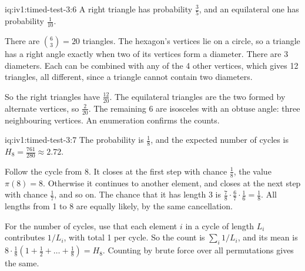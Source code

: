 \begin{solution}{iq:iv1:timed-test-3:6}
A right triangle has probability $\frac35$, and an equilateral one has probability $\frac{1}{10}$.

There are $\binom63 = 20$ triangles. The hexagon's vertices lie on a circle, so a triangle has a right angle exactly when two of its vertices form a diameter. There are 3 diameters. Each can be combined with any of the 4 other vertices, which gives 12 triangles, all different, since a triangle cannot contain two diameters.

So the right triangles have $\frac{12}{20}$. The equilateral triangles are the two formed by alternate vertices, so $\frac{2}{20}$. The remaining 6 are isosceles with an obtuse angle: three neighbouring vertices. An enumeration confirms the counts.

\end{solution}

\begin{solution}{iq:iv1:timed-test-3:7}
The probability is $\frac18$, and the expected number of cycles is $H_8 = \frac{761}{280} \approx 2.72$.

Follow the cycle from 8. It closes at the first step with chance $\frac18$, the value $\pi(8) = 8$. Otherwise it continues to another element, and closes at the next step with chance $\frac17$, and so on. The chance that it has length 3 is $\frac78 \cdot \frac67 \cdot \frac16 = \frac18$. All lengths from 1 to 8 are equally likely, by the same cancellation.

For the number of cycles, use that each element $i$ in a cycle of length $L_i$ contributes $1/L_i$, with total 1 per cycle. So the count is $\sum_i1/L_i$, and its mean is $8 \cdot \frac18(1 + \frac12 + \dots + \frac18) = H_8$. Counting by brute force over all permutations gives the same.

\end{solution}

